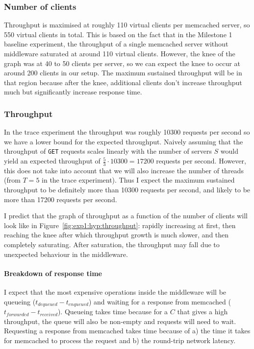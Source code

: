 \documentclass[11pt]{article}
\newcommand{\get}[0]{\texttt{GET}}
\begin{document}
\subsubsection{Number of clients}
Throughput is maximised at roughly 110 virtual clients per memcached server, so 550 virtual clients in total. This is based on the fact that in the Milestone 1 baseline experiment, the throughput of a single memcached server without middleware saturated at around 110 virtual clients. However, the knee of the graph was at 40 to 50 clients per server, so we can expect the knee to occur at around 200 clients in our setup. The maximum sustained throughput will be in that region because after the knee, additional clients don't increase throughput much but significantly increase response time.

\subsubsection{Throughput}
In the trace experiment the throughput was roughly 10300 requests per second so we have a lower bound for the expected throughput. Naively assuming that the throughput of \get{} requests scales linearly with the number of servers $S$ would yield an expected throughput of $\frac{5}{3} \cdot 10300 = 17200$ requests per second. However, this does not take into account that we will also increase the number of threads (from $T=5$ in the trace experiment). Thus I expect the maximum sustained throughput to be definitely more than 10300 requests per second, and likely to be more than 17200 requests per second.

I predict that the graph of throughput as a function of the number of clients will look like in Figure~\ref{fig:exp1:hyp:throughput}: rapidly increasing at first, then reaching the knee after which throughput growth is much slower, and then completely saturating. After saturation, the throughput may fall due to unexpected behaviour in the middleware.

\paragraph{Breakdown of response time}
I expect that the most expensive operations inside the middleware will be queueing ($t_{dequeued}-t_{enqueued}$) and waiting for a response from memcached ($t_{forwarded}-t_{received}$). Queueing takes time because for a $C$ that gives a high throughput, the queue will also be non-empty and requests will need to wait. Requesting a response from memcached takes time because of a) the time it takes for memcached to process the request and b) the round-trip network latency.
\end{document}
